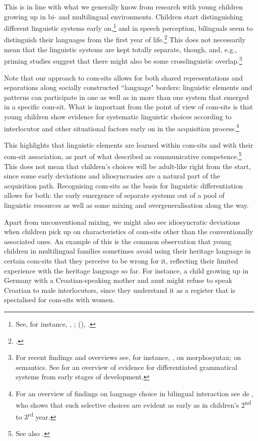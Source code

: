 This is in line with what we generally know from research with young children growing up in bi- and multilingual environments. Children start distinguishing different linguistic systems early on,\footnote{See, for instance, \citet{Meisel1989}, \citet{DeHouwer1990}; (\citeyear{DeHouwer2021}), \citet{Genesee2019}.} and in speech perception, bilinguals seem to distinguish their languages from the first year of life.\footnote{\citet{Serratrice2018}.} This does not necessarily mean that the linguistic systems are kept totally separate, though, and, e.g., priming studies suggest that there might also be some crosslinguistic overlap.\footnote{For recent findings and overviews see, for instance, \citet{Serratrice2022}, \citet{GámezEtal2022} on morphosyntax; \citet{Engemann2022} on semantics. See \citet{Genesee2019} for an overview of evidence for differentiated grammatical systems from early stages of development.}

Note that our approach to com-sits allows for both shared representations and separations along socially constructed “language" borders: linguistic elements and patterns can participate in one as well as in more than one system that emerged in a specific com-sit. What is important from the point of view of com-sits is that young children show evidence for systematic linguistic choices according to interlocutor and other situational factors early on in the acquisition process.\footnote{For an overview of findings on language choice in bilingual interaction see de \citet{DeHouwer2018}, who shows that such selective choices are evident as early as in children’s 2\textsuperscript{nd} to 3\textsuperscript{rd} year.}

This highlights that linguistic elements are learned within com-sits and with their com-sit association, as part of what \citet{Gumperz1981} described as communicative competence.\footnote{See also \citet{Møller2019}.} This does not mean that children’s choices will be adult-like right from the start, since some early deviations and idiosyncrasies are a natural part of the acquisition path. Recognising com-sits as the basis for linguistic differentiation allows for both: the early emergence of separate systems out of a pool of linguistic resources as well as some mixing and overgeneralisation along the way.

Apart from unconventional mixing, we might also see idiosyncratic deviations when children pick up on characteristics of com-sits other than the conventionally associated ones. An example of this is the common observation that young children in multilingual families sometimes avoid using their heritage language in certain com-sits that they perceive to be wrong for it, reflecting their limited experience with the heritage language so far. For instance, a child growing up in Germany with a Croatian-speaking mother and aunt might refuse to speak Croatian to male interlocutors, since they understand it as a register that is specialised for com-sits with women.

